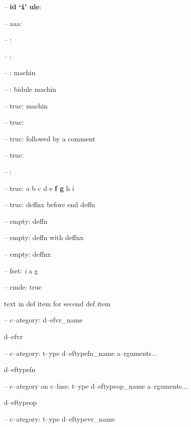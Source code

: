 \documentclass{book}
\begin{document}
\begin{titlepage}
%
\hbox{}-- \textbf{id `\texttt{i}' ule}: 



\hbox{}-- aaa: 


\hbox{}-- : 


\hbox{}-- : 


\hbox{}-- : machin


%
\hbox{}-- : bidule machin


%
\hbox{}-- truc: machin


%
\hbox{}-- truc: 


\hbox{}-- truc: followed by a comment


%
\hbox{}-- truc: 


\hbox{}-- : 


\hbox{}-- truc: a b c d e \textbf{f g} h i


%
\hbox{}-- truc: deffnx before end deffn


%

\hbox{}-- empty: deffn


%

\hbox{}-- empty: deffn with deffnx


%
\hbox{}-- empty: deffnx


%

\hbox{}-- fset: \emph{i} a g


%
\hbox{}-- cmde: truc 


%
text in def item for second def item

\hbox{}-- c--ategory: d--efvr\_name


%
d--efvr

\hbox{}-- c--ategory: t--ype d--eftypefn\_name a--rguments...


%
d--eftypefn

\hbox{}-- c--ategory on c--lass: t--ype d--eftypeop\_name a--rguments...


%
d--eftypeop

\hbox{}-- c--ategory: t--ype d--eftypevr\_name



\end{titlepage}
\end{document}
